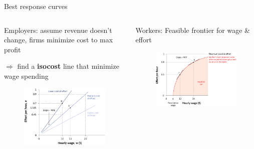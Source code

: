 \documentclass[11pt,aspectratio=43,usenames,dvipsnames]{beamer}
\theoremstyle{definition}
\begin{document}
\begin{frame}{Best response curves}
\label{slide:Best_response_curves}
    \begin{columns}
        \begin{column}{0.5\textwidth}
            Employers: \alert{assume revenue doesn't change}, firms minimize cost to max profit

            $ \Rightarrow  $ find a \textbf{isocost} line that minimize wage spending
            \begin{figure}
                \centering
                \includegraphics[width=\textwidth]{./figures/MRSEmployer.png}
            \end{figure}
        \end{column}
        \begin{column}{0.5\textwidth}
            Workers: Feasible frontier for wage \& effort
            \begin{figure}
                \centering
                \includegraphics[width=\textwidth]{./figures/MRTWorkers.png}
            \end{figure}

        \end{column}
    \end{columns}

\end{frame}
\end{document}

